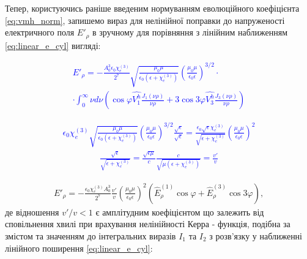 Тепер, користуючись раніше введеним нормуванням еволюційного коефіцієнта 
\eqref{eq:vmh_norm}, запишемо вираз для нелінійної поправки до напруженості 
електричного поля $ E'_\rho $ в зручному для порівняння з лінійним наближенням
\eqref{eq:linear_e_cyl} вигляді:

\textcolor{blue} { \begin{equation*} \begin{aligned}
E'_\rho = - \frac{A_0^3 \epsilon_0 \chi_e^{(3)}}{2^7}
\sqrt{\frac{\mu_0 \mu}{\epsilon_0 \left( \epsilon + \chi_e^{(3)} \right)}} 
\left( \frac{\mu_0 \mu}{\epsilon_0 \epsilon} \right)^{3/2} \cdot \\
\cdot \int_0^\infty \nu d \nu \left(
\cos \varphi \hat{V_1^h} \frac{J_1(\nu \rho)}{\nu \rho} +
3 \cos 3\varphi \hat{V_3^h} \frac{J_3(\nu \rho)}{\nu \rho} 
\right)
\end{aligned} \end{equation*} }

\textcolor{blue} { \begin{equation*} \begin{aligned}
\epsilon_0 \chi_e^{(3)}
\sqrt{\frac{\mu_0 \mu}{\epsilon_0 \left( \epsilon + \chi_e^{(3)} \right)}} 
\left( \frac{\mu_0 \mu}{\epsilon_0 \epsilon} \right)^{3/2} 
\frac{\sqrt{\epsilon}}{\sqrt{\epsilon}} =
\frac{\epsilon_0 \sqrt{\epsilon} \chi_e^{(3)}}
{\sqrt{\epsilon + \chi_e^{(3)}}} 
\left( \frac{\mu_0 \mu}{\epsilon_0 \epsilon} \right)^2
\end{aligned} \end{equation*} }
%
\textcolor{blue} { \begin{equation*} \begin{aligned}
\frac{\sqrt{\epsilon}}
{\sqrt{\epsilon + \chi_e^{(3)}}} =
\frac{\sqrt{\epsilon \mu}}{c} 
\frac{c}{\sqrt{\mu \left( \epsilon + \chi_e^{(3)} \right)}} = 
\frac{v'}{v}
\end{aligned} \end{equation*} }

\begin{equation} \begin{aligned} \label{eq:erho_kerr}
E'_\rho = - \frac{\epsilon_0 \chi_e^{(3)} A_0^3}{2^7}
\frac{v'}{v}
\left( \frac{\mu_0 \mu}{\epsilon_0 \epsilon} \right)^2
\left(\hat{E}_\rho^{(1)} \cos \varphi +
\hat{E}_\rho^{(3)} \cos 3 \varphi \right),
\end{aligned} \end{equation}
%
де відношення $ v'/v < 1 $ є амплітудним коефіцієнтом що залежить від 
сповільнення хвилі при врахування нелінійності Керра - функція, подібна 
за змістом та значенням до інтегральних виразів $ I_1 $ та $ I_2 $ з 
розв'язку у наближенні лінійного поширення \eqref{eq:linear_e_cyl}:

